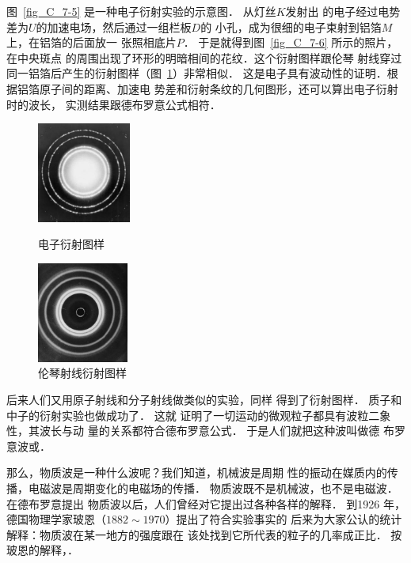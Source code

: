 图~\ref{fig_C_7-5} 是一种电子衍射实验的示意图．
从灯丝$K$发射出
的电子经过电势差为$U$的加速电场，然后通过一组栏板$D$的
小孔，成为很细的电子束射到铝箔$M$上，在铝箔的后面放一
张照相底片$P$．
于是就得到图~\ref{fig_C_7-6} 所示的照片，在中央斑点
的周围出现了环形的明暗相间的花纹．这个衍射图样跟伦琴
射线穿过同一铝箔后产生的衍射图样（图~\ref{fig_C_7-7}）非常相似．
这是电子具有波动性的证明．根据铝箔原子间的距离、加速电
势差和衍射条纹的几何图形，还可以算出电子衍射时的波长，
实测结果跟德布罗意公式相符．
\begin{figure}[htbp]
    \centering
    \begin{minipage}[t]{0.48\textwidth}
        \centering
        \includegraphics[height=3.3cm]{fig/C/7-6.jpg}
        \caption{电子衍射图样}\label{fig_C_7-6}
    \end{minipage}
    \begin{minipage}[t]{0.48\textwidth}
        \centering
        \includegraphics[height=3.3cm]{fig/C/7-7.jpg}
        \caption{伦琴射线衍射图样}\label{fig_C_7-7}
    \end{minipage}
\end{figure}


后来人们又用原子射线和分子射线做类似的实验，同样
得到了衍射图样．
质子和中子的衍射实验也做成功了．
这就
证明了一切运动的微观粒子都具有波粒二象性，其波长与动
量的关系都符合德布罗意公式．
于是人们就把这种波叫做德
布罗意波或．

那么，物质波是一种什么波呢？我们知道，机械波是周期
性的振动在媒质内的传播，电磁波是周期变化的电磁场的传播．
物质波既不是机械波，也不是电磁波．
在德布罗意提出
物质波以后，人们曾经对它提出过各种各样的解释．
到1926
年，德国物理学家玻恩（$1882 \sim 1970$）提出了符合实验事实的
后来为大家公认的统计解释：物质波在某一地方的强度跟在
该处找到它所代表的粒子的几率成正比．
按玻恩的解释，．

